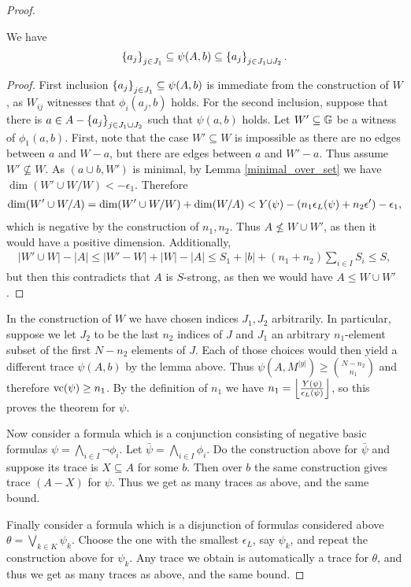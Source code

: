 \documentclass{amsart}
\begin{document}
\begin{proof}
  \begin{Lemma} We have
    \begin{align*}
      \left\{a_j\right\}_{j \in J_1} \subseteq \psi(A, b) \subseteq \left\{a_j\right\}_{j \in J_1 \cup J_2}.
    \end{align*}
  \end{Lemma}
  \begin{proof}
    First inclusion $\left\{a_j\right\}_{j \in J_1} \subseteq \psi(A, b)$ is immediate from the construction of $W$,
    as $W_{ij}$ witnesses that $\phi_i(a_j, b)$ holds.
    For the second inclusion, suppose that there is $a \in A - \left\{a_j\right\}_{j \in J_1 \cup J_2}$ such that $\psi(a,b)$ holds.
    Let $W' \subseteq \mathbb G$ be a witness of $\phi_1(a,b)$.
    First, note that the case $W' \subseteq W$ is impossible
    as there are no edges between $a$ and $W - a$, but there are edges between $a$ and $W' - a$.
    Thus assume $W' \not\subseteq W$.
    As $(a \cup b, W')$ is minimal, by Lemma \ref{minimal_over_set} we have $\dim (W' \cup W / W) < -\epsilon_1$.
    Therefore
    \begin{align*}
      \dim(W' \cup W / A) = \dim (W' \cup W / W) + \dim(W/A) < Y(\psi) - \left(n_1 \epsilon_L(\psi) + n_2 \epsilon'\right) - \epsilon_1,
    \end{align*}
    which is negative by the construction of $n_1, n_2$.
    Thus $A \not\leq W \cup W'$, as then it would have a positive dimension.
    Additionally,
    \begin{align*}
      |W' \cup W| - |A| \leq |W' - W| + |W| - |A| \leq S_1 + |b| + (n_1 + n_2) \sum_{i \in I} S_i \leq S,
    \end{align*}
    but then this contradicts that $A$ is $S$-strong, as then we would have $A \leq W \cup W'$.
  \end{proof}

  In the construction of $W$ we have chosen indices $J_1, J_2$ arbitrarily.
  In particular, suppose we let $J_2$ to be the last $n_2$ indices of $J$ and
  $J_1$ an arbitrary $n_1$-element subset of the first $N - n_2$ elements of $J$.
  Each of those choices would then yield a different trace $\psi(A, b)$ by the lemma above.
  Thus $\psi(A, M^{|y|}) \geq {N - n_2 \choose n_1}$ and therefore $\operatorname{vc}(\psi) \geq n_1$.
  By the definition of $n_1$ we have $n_1 = \left \lfloor \frac{Y(\psi)}{\epsilon_L(\psi)} \right \rfloor$, so this proves the theorem for $\psi$.
 
  Now consider a formula which is a conjunction consisting of negative basic formulas $\psi = \bigwedge_{i \in I} \neg \phi_i$.
  Let $\bar \psi = \bigwedge_{i \in I} \phi_i$.
  Do the construction above for $\bar \psi$ and suppose its trace is $X \subseteq A$ for some $b$.
  Then over $b$ the same construction gives trace $(A - X)$ for $\psi$. Thus we get as many traces as above, and the same bound.
  
  Finally consider a formula which is a disjunction of formulas considered above $\theta = \bigvee_{k \in K} \psi_k$.
  Choose the one with the smallest $\epsilon_L$, say $\psi_k$, and repeat the construction above for $\psi_k$.
  Any trace we obtain is automatically a trace for $\theta$, and thus we get as many traces as above, and the same bound.
\end{proof}
\end{document}
